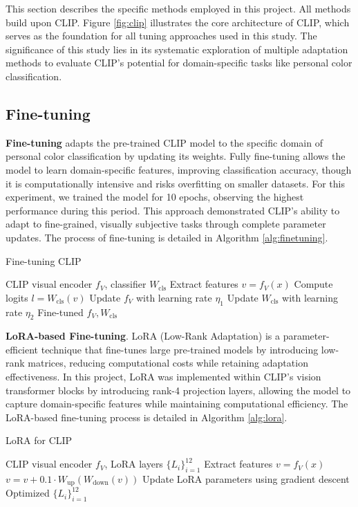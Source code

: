 \documentclass[twocolumn]{article}
\begin{document}
This section describes the specific methods employed in this project. All methods build upon CLIP. Figure \ref{fig:clip} illustrates the core architecture of CLIP, which serves as the foundation for all tuning approaches used in this study. The significance of this study lies in its systematic exploration of multiple adaptation methods to evaluate CLIP's potential for domain-specific tasks like personal color classification.

\subsection{Fine-tuning}
\textbf{Fine-tuning} adapts the pre-trained CLIP model to the specific domain of personal color classification by updating its weights. Fully fine-tuning allows the model to learn domain-specific features, improving classification accuracy, though it is computationally intensive and risks overfitting on smaller datasets. For this experiment, we trained the model for 10 epochs, observing the highest performance during this period. This approach demonstrated CLIP's ability to adapt to fine-grained, visually subjective tasks through complete parameter updates. The process of fine-tuning is detailed in Algorithm \ref{alg:finetuning}.

\begin{algorithm}
\caption{Fine-tuning CLIP}
\label{alg:finetuning}
\begin{algorithmic}[1]
\Require CLIP visual encoder $f_V$, classifier $W_{\text{cls}}$
    \State Extract features $v = f_V(x)$
    \State Compute logits $l = W_{\text{cls}}(v)$
    \State Update $f_V$ with learning rate $\eta_1$
    \State Update $W_{\text{cls}}$ with learning rate $\eta_2$
\EndFor
\State \Return Fine-tuned $f_V, W_{\text{cls}}$
\end{algorithmic}
\end{algorithm}

\textbf{LoRA-based Fine-tuning}.
LoRA (Low-Rank Adaptation) is a parameter-efficient technique that fine-tunes large pre-trained models by introducing low-rank matrices, reducing computational costs while retaining adaptation effectiveness. In this project, LoRA was implemented within CLIP's vision transformer blocks by introducing rank-4 projection layers, allowing the model to capture domain-specific features while maintaining computational efficiency. The LoRA-based fine-tuning process is detailed in Algorithm \ref{alg:lora}.

\begin{algorithm}
\caption{LoRA for CLIP}
\label{alg:lora}
\begin{algorithmic}[1]
\Require CLIP visual encoder $f_V$, LoRA layers $\{L_i\}_{i=1}^{12}$
    \State Extract features $v = f_V(x)$
        \State $v = v + 0.1 \cdot W_{\text{up}}(W_{\text{down}}(v))$
    \EndFor
    \State Update LoRA parameters using gradient descent
\EndFor
\State \Return Optimized $\{L_i\}_{i=1}^{12}$
\end{algorithmic}
\end{algorithm}
\end{document}
